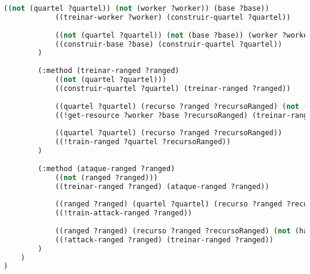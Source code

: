 \begin{lstlisting}[language=lisp]
			((not (quartel ?quartel)) (not (worker ?worker)) (base ?base))
			((treinar-worker ?worker) (construir-quartel ?quartel))
		
			((not (quartel ?quartel)) (not (base ?base)) (worker ?worker))
			((construir-base ?base) (construir-quartel ?quartel))
		)
		
		(:method (treinar-ranged ?ranged)
			((not (quartel ?quartel)))	
			((construir-quartel ?quartel) (treinar-ranged ?ranged))
			
			((quartel ?quartel) (recurso ?ranged ?recursoRanged) (not (have ?recursoRanged)) (worker ?worker) (base ?base))
			((!get-resource ?worker ?base ?recursoRanged) (treinar-ranged ?ranged))
			
			((quartel ?quartel) (recurso ?ranged ?recursoRanged))
			((!train-ranged ?quartel ?recursoRanged))
		)
		
		(:method (ataque-ranged ?ranged)
			((not (ranged ?ranged)))
			((treinar-ranged ?ranged) (ataque-ranged ?ranged))
			
			((ranged ?ranged) (quartel ?quartel) (recurso ?ranged ?recursoRanged) (have ?recursoRanged))
			((!train-attack-ranged ?ranged))
			
			((ranged ?ranged) (recurso ?ranged ?recursoRanged) (not (have ?recursoRanged)))
			((!attack-ranged ?ranged) (treinar-ranged ?ranged))
		)        
	)
)


\end{lstlisting}
